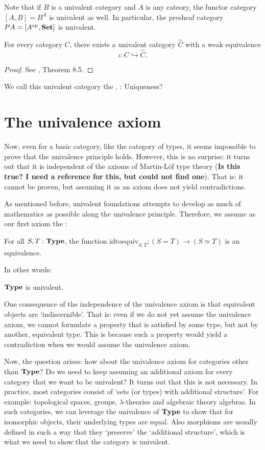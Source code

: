 Note that if $ B $ is a univalent category and $ A $ is any cateory, the functor category $ [A, B] = B^A $ is univalent as well. In particular, the presheaf category $ P A = [A^{\text{op}}, \mathbf{Set}] $ is univalent.

\begin{lemma}
  For every category $ C $, there exists a univalent category $ \hat C $ with a weak equivalence
  \[ \iota: C \hookrightarrow \hat C. \]
\end{lemma}
\begin{proof}
  See \cite{univalent-categories}, Theorem 8.5.
\end{proof}
We call this univalent category the .
\TODO: Uniqueness?

\section{The univalence axiom}
Now, even for a basic category, like the category of types, it seems impossible to prove that the univalence principle holds. However, this is no surprise: it turns out that it is independent of the axioms of Martin-Löf type theory (\TODO \textbf{Is this true? I need a reference for this, but could not find one}). That is: it cannot be proven, but assuming it as an axiom does not yield contradictions.

As mentioned before, univalent foundations attempts to develop as much of mathematics as possible along the univalence principle. Therefore, we assume as our first axiom the :
\begin{axiom}
  For all $ S, T: \mathbf{Type} $, the function $ \mathrm{idtoequiv}_{S, T}: (S = T) \to (S \simeq T) $ is an equivalence.
\end{axiom}
In other words:
\begin{axiom}
  $ \mathbf{Type} $ is univalent.
\end{axiom}

\begin{remark}
  One consequence of the independence of the univalence axiom is that equivalent objects are `indiscernible'. That is: even if we do not yet assume the univalence axiom, we cannot formulate a property that is satisfied by some type, but not by another, equivalent type. This is because such a property would yield a contradiction when we would assume the univalence axiom.
\end{remark}

Now, the question arises: how about the univalence axiom for categories other than $ \mathbf{Type} $? Do we need to keep assuming an additional axiom for every category that we want to be univalent? It turns out that this is not necessary. In practice, most categories consist of `sets (or types) with additional structure'. For example: topological spaces, groups, $ \lambda $-theories and algebraic theory algebras. In such categories, we can leverage the univalence of $ \mathbf{Type} $ to show that for isomorphic objects, their underlying types are equal. Also morphisms are usually defined in such a way that they `preserve' the `additional structure', which is what we need to show that the category is univalent.

